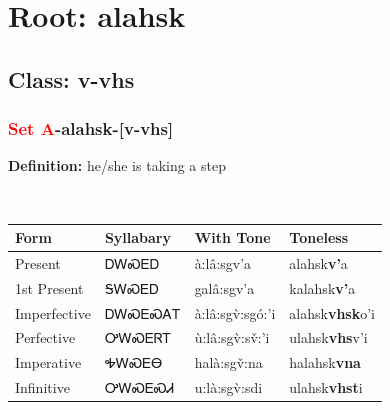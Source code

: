 \needspace{4in}
\section*{Root: alahsk}
\nopagebreak
{}
\needspace{3in}
\subsection*{Class: v-vhs}
\nopagebreak
\needspace{2in}
\subsubsection*{\textcolor{Red}{Set A}{-}\textbf{alahsk}{-}[v-vhs]}
\nopagebreak
\textbf{Definition: } he/she is taking a step
\\[0.5em]
\begin{tabularx}{\textwidth}{l X X X}%
\toprule%
\textbf{Form}&\textbf{Syllabary}&\textbf{With Tone}&\textbf{Toneless}\\%
\midrule%
Present&ᎠᎳᏍᎬᎠ&à:lâ:sgv’a&alahsk\textbf{v'}a\\%
1st Present&ᎦᎳᏍᎬᎠ&galâ:sgv’a&kalahsk\textbf{v'}a\\%
Imperfective&ᎠᎳᏍᎬᏍᎪᎢ&à:lâ:sgv̀:sgó:’i&alahsk\textbf{vhsk}o'i\\%
Perfective&ᎤᎳᏍᎬᏒᎢ&ù:lâ:sgv̀:sv̌:’i&ulahsk\textbf{vhs}v'i\\%
Imperative&ᎭᎳᏍᎬᎾ&halà:sgv̌:na&halahsk\textbf{vna}\\%
Infinitive&ᎤᎳᏍᎬᏍᏗ&u:là:sgv̀:sdi&ulahsk\textbf{vhst}i\\%
\bottomrule%
\end{tabularx}
\\[1em]